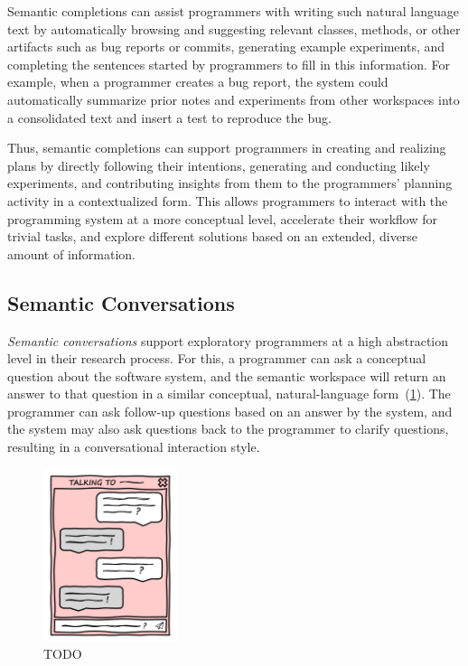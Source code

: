 Semantic completions can assist programmers with writing such natural language text by automatically browsing and suggesting relevant classes, methods, or other artifacts such as bug reports or commits, generating example experiments, and completing the sentences started by programmers to fill in this information.
For example, when a programmer creates a bug report, the system could automatically summarize prior notes and experiments from other workspaces into a consolidated text and insert a test to reproduce the bug.

\ParSep

Thus, semantic completions can support programmers in creating and realizing plans by directly following their intentions, generating and conducting likely experiments, and contributing insights from them to the programmers' planning activity in a contextualized form.
This allows programmers to interact with the programming system at a more conceptual level, accelerate their workflow for trivial tasks, and explore different solutions based on an extended, diverse amount of information.


\subsection{Semantic Conversations}
\label{sec:approach/workspace/conversations}

\emph{Semantic conversations} support exploratory programmers at a high abstraction level in their research process.
For this, a programmer can ask a conceptual question about the software system, and the semantic workspace will return an answer to that question in a similar conceptual, natural-language form~(\cref{fig:approach/workspace/conversation}).
The programmer can ask follow-up questions based on an answer by the system, and the system may also ask questions back to the programmer to clarify questions, resulting in a conversational interaction style.

\begin{figure}
	\centering
	\includegraphics[width=0.35\textwidth]{02_workspace/conversation.png}
	\caption[TODO]{
		TODO
	}
	\label{fig:approach/workspace/conversation}
\end{figure}

